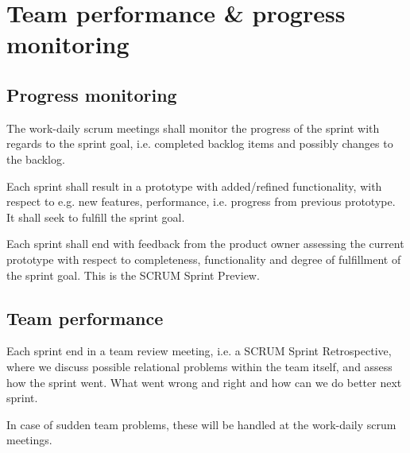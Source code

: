 \section{Team performance \& progress monitoring}

\subsection{Progress monitoring}
The work-daily scrum meetings shall monitor the progress of the sprint with regards to the sprint goal, i.e. completed backlog items and possibly changes to the backlog.

Each sprint shall result in a prototype with added/refined functionality, with respect to e.g. new features, performance, i.e. progress from previous prototype. It shall seek to fulfill the sprint goal.

Each sprint shall end with feedback from the product owner assessing the current prototype with respect to completeness, functionality and degree of fulfillment of the sprint goal. This is the SCRUM Sprint Preview.

\subsection{Team performance}
Each sprint end in a team review meeting, i.e. a SCRUM Sprint Retrospective, where we discuss possible relational problems within the team itself, and assess how the sprint went. What went wrong and right and how can we do better next sprint.

In case of sudden team problems, these will be handled at the work-daily scrum meetings.
